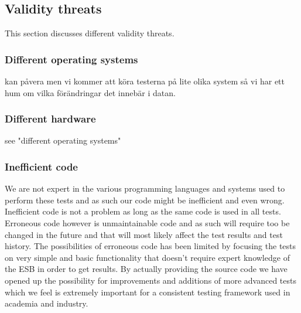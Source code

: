 \subsection{Validity threats}
This section discusses different validity threats.
\subsubsection{Different operating systems}
kan påvera men vi kommer att köra testerna på lite olika system så vi har ett hum om vilka förändringar det innebär i datan.
\subsubsection{Different hardware}
see "different operating systems"
\subsubsection{Inefficient code}
We are not expert in the various programming languages and systems used to perform these tests and as such our code might be inefficient and even wrong. Inefficient code is not a problem as long as the same code is used in all tests. Erroneous code however is unmaintainable code and as such will require too be changed in the future and that will most likely affect the test results and test history. 
The possibilities of erroneous code has been limited by focusing the tests on very simple and basic functionality that doesn't require expert knowledge of the ESB in order to get results.
By actually providing the source code we have opened up the possibility for improvements and additions of more advanced tests which we feel is extremely important for a consistent testing framework used in academia and industry.